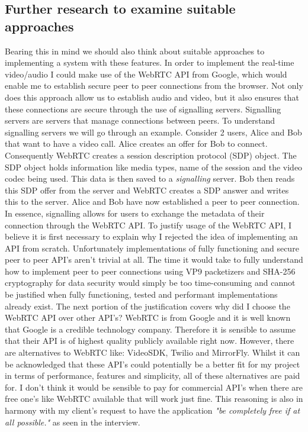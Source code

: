 \subsection{Further research to examine suitable approaches}
\label{sec:further}

Bearing this in mind we should also think about suitable 
approaches to implementing a system with these features. In 
order to implement the real-time video/audio I could make use
of the WebRTC API from Google, which would enable me to 
establish secure peer to peer connections from the browser. 
Not only does this approach allow us to establish audio and 
video, but it also ensures that these connections are secure 
through the use of signalling servers. Signalling servers are
servers that manage connections between peers. To understand 
signalling servers we will go through an example. Consider 2 
users, Alice and Bob that want to have a video call. Alice 
creates an offer for Bob to connect. Consequently WebRTC 
creates a session description protocol (SDP) object. The SDP 
object holds information like media types, name of the
session and the video codec being used. This data is then 
saved to a \textit{signalling} server. Bob then reads this SDP
offer from the server and WebRTC creates a SDP answer and
writes this to the server. Alice and Bob have now established 
a peer to peer connection. In essence, signalling allows for 
users to exchange the metadata of their connection through the
WebRTC API. To justify usage of the WebRTC API, I believe it 
is first necessary to explain why I rejected the idea of
implementing an API from scratch. Unfortunately
implementations of fully functioning and secure peer to peer
API's aren't trivial at all. The time it would take to fully
understand how to implement peer to peer connections using 
VP9 packetizers \cite{vp9} and SHA-256 cryptography for data
security would simply be too time-consuming and cannot be
justified when fully functioning, tested and performant 
implementations already exist. The next 
portion of the justification covers why did I choose the
WebRTC API over other API's? WebRTC is from Google and it is 
well known that Google is a credible technology company. 
Therefore it is sensible to assume that their API is of 
highest quality publicly available right now. However, there
are alternatives to WebRTC like: VideoSDK, Twilio and 
MirrorFly. Whilst it can be acknowledged that these API's could
potentially be a better fit for my project in terms of
performance, features and simplicity, all of these alternatives
are paid for. I don't think it would be sensible to pay for
commercial API's when there are free one's like WebRTC
available that will work just fine. This reasoning is also in 
harmony with my client's request to have the application
\textit{"be completely free if at all possible."} as seen in 
the interview. \\ \vspace{0.2cm}

